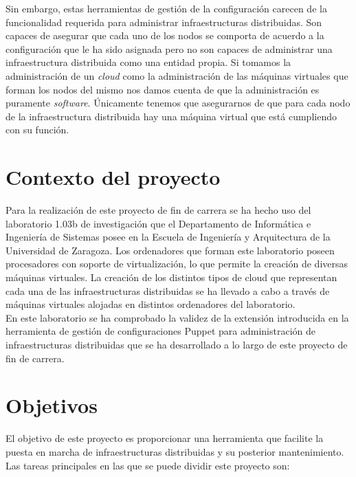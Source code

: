 Sin embargo, estas herramientas de gestión de la configuración carecen de la funcionalidad requerida para administrar infraestructuras distribuidas. Son capaces de asegurar que cada uno de los nodos se comporta de acuerdo a la configuración que le ha sido asignada pero no son capaces de administrar una infraestructura distribuida como una entidad propia. Si tomamos la administración de un \emph{cloud} como la administración de las máquinas virtuales que forman los nodos del mismo nos damos cuenta de que la administración es puramente \emph{software}. Únicamente tenemos que asegurarnos de que para cada nodo de la infraestructura distribuida hay una máquina virtual que está cumpliendo con su función.\\


\section{Contexto del proyecto}

Para la realización de este proyecto de fin de carrera se ha hecho uso del laboratorio 1.03b de investigación que el Departamento de Informática e Ingeniería de Sistemas posee en la Escuela de Ingeniería y Arquitectura de la Universidad de Zaragoza. Los ordenadores que forman este laboratorio poseen procesadores con soporte de virtualización, lo que permite la creación de diversas máquinas virtuales. La creación de los distintos tipos de cloud que representan cada una de las infraestructuras distribuidas se ha llevado a cabo a través de máquinas virtuales alojadas en distintos ordenadores del laboratorio.\\

En este laboratorio se ha comprobado la validez de la extensión introducida en la herramienta de gestión de configuraciones Puppet para administración de infraestructuras distribuidas que se ha desarrollado a lo largo de este proyecto de fin de carrera.


\section{Objetivos}

El objetivo de este proyecto es proporcionar una herramienta que facilite la puesta en marcha de infraestructuras distribuidas y su posterior mantenimiento. Las tareas principales en las que se puede dividir este proyecto son:

